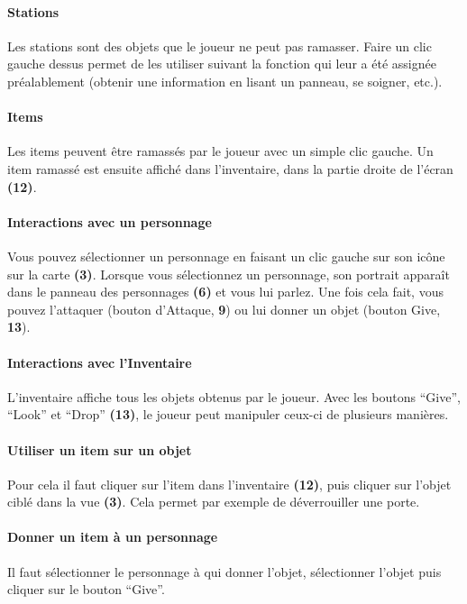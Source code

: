 \documentclass[./standalone.tex]{subfiles}
\begin{document}
\paragraph{Stations\\}
    Les stations sont des objets que le joueur ne peut pas ramasser. Faire un clic gauche dessus permet de les utiliser suivant la fonction qui leur a été assignée préalablement (obtenir une information en lisant un panneau, se soigner, etc.).
            
\paragraph{Items\\}
	Les items peuvent être ramassés par le joueur avec un simple clic gauche. Un item ramassé est ensuite affiché dans l’inventaire, dans la partie droite de l’écran \textbf{(12)}.
        
\paragraph{Interactions avec un personnage\\}
Vous pouvez sélectionner un personnage en faisant un clic gauche sur son icône sur la carte \textbf{(3)}. Lorsque vous sélectionnez un personnage, son portrait apparaît dans le panneau des personnages \textbf{(6)} et vous lui parlez. Une fois cela fait, vous pouvez l’attaquer (bouton d’Attaque, \textbf{9}) ou lui donner un objet (bouton Give, \textbf{13}).
        
\paragraph{Interactions avec l’Inventaire\\}
    L’inventaire affiche tous les objets obtenus par le joueur. Avec les boutons “Give”, “Look” et “Drop” \textbf{(13)}, le joueur peut manipuler ceux-ci de plusieurs manières.

\paragraph{Utiliser un item sur un objet\\}
	Pour cela il faut cliquer sur l’item dans l’inventaire \textbf{(12)}, puis cliquer sur l’objet ciblé dans la vue \textbf{(3)}. Cela permet par exemple de déverrouiller une porte.
        
\paragraph{Donner un item à un personnage\\}
    Il faut sélectionner le personnage à qui donner l’objet, sélectionner l’objet puis cliquer sur le bouton “Give”.
        
\end{document}
